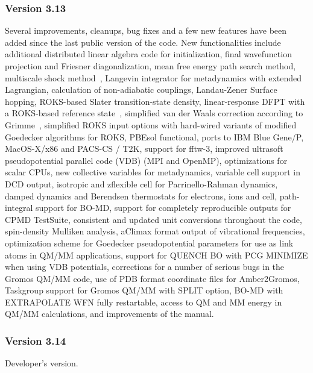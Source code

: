 \documentclass[twoside,10pt,titlepage,a4paper]{article}
\begin{document}
\subsubsection{Version 3.13}
  Several improvements, cleanups, bug fixes and a few new features
  have been added since the last public version of the code.
  New functionalities include additional distributed linear algebra code 
  for initialization, final wavefunction projection and Friesner 
  diagonalization, mean free energy path search method, multiscale 
  shock method~\cite{shock}, Langevin integrator for metadynamics 
  with extended Lagrangian, calculation of non-adiabatic couplings, 
  Landau-Zener Surface hopping, ROKS-based Slater transition-state
  density, linear-response DFPT with a ROKS-based reference 
  state~\cite{GrimmJCP2003}, simplified van der Waals correction 
  according to Grimme~\cite{Grimme06}, simplified ROKS input options
  with hard-wired variants of modified Goedecker algorithms for ROKS,
  PBEsol functional, ports to IBM Blue Gene/P, MacOS-X/x86 and PACS-CS / T2K,
  support for fftw-3, improved  ultrasoft pseudopotential parallel code (VDB) 
  (MPI and OpenMP), optimizations for scalar CPUs, new collective 
  variables for metadynamics, variable cell support in DCD output, 
  isotropic and zflexible cell for Parrinello-Rahman dynamics, 
  damped dynamics and Berendsen thermostats for electrons, ions and cell,
  path-integral support for BO-MD, support for completely reproducible 
  outputs for CPMD TestSuite, consistent and updated unit conversions 
  throughout the code, spin-density Mulliken analysis,
  aClimax format output of vibrational frequencies, optimization scheme 
  for Goedecker pseudopotential parameters for use as link atoms in 
  QM/MM applications, support for QUENCH BO with PCG MINIMIZE when using 
  VDB potentials, corrections for a number of serious bugs in the Gromos 
  QM/MM code, use of PDB format coordinate files for Amber2Gromos,
  Taskgroup support for Gromos QM/MM with SPLIT option, BO-MD with 
  EXTRAPOLATE WFN fully restartable, access to QM and MM energy in 
  QM/MM calculations, and improvements of the manual.

\subsubsection{Version 3.14}

  Developer's version.
\end{document}
